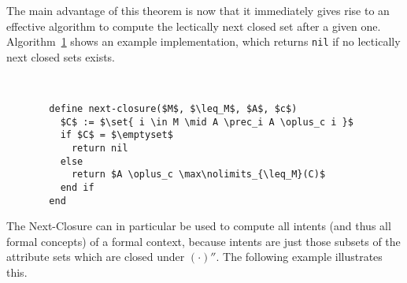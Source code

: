 The main advantage of this theorem is now that it immediately gives rise to an effective
algorithm to compute the lectically next closed set after a given one.
Algorithm~\ref{alg:next-closure} shows an example implementation, which returns
\lstinline{nil} if no lectically next closed sets exists.


\begin{figure}[tp]
\begin{Algorithm}~
  \label{alg:next-closure}
  \begin{lstlisting}
  define next-closure($M$, $\leq_M$, $A$, $c$)
    $C$ := $\set{ i \in M \mid A \prec_i A \oplus_c i }$
    if $C$ = $\emptyset$
      return nil
    else
      return $A \oplus_c \max\nolimits_{\leq_M}(C)$
    end if
  end  
  \end{lstlisting}
\end{Algorithm}
\end{figure}

The Next-Closure can in particular be used to compute all intents (and thus all formal
concepts) of a formal context, because intents are just those subsets of the attribute
sets which are closed under $(\cdot)''$.  The following example illustrates this.

